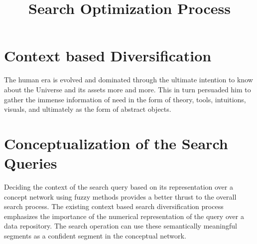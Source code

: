 \documentclass{article}
\title{Search Optimization Process}
\begin{document}
 
\maketitle
\section{Context based Diversification} The  human  era  is  evolved  and  dominated  through  the  ultimate  intention  to  know about the Universe and its assets more and more. This in turn persuaded him to gather the immense information of need in the form of theory, tools, intuitions, visuals, and  ultimately as the form of abstract objects.
\section{ Conceptualization of the Search Queries} Deciding the context of the search query based on its representation over a concept network using fuzzy methods provides a better thrust to the overall search process. The existing context based search diversification process emphasizes the importance of the numerical representation of the query over a data repository. The search operation can use these semantically meaningful segments as a confident segment in the conceptual network.
\end{document}

